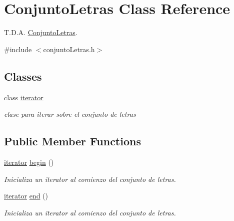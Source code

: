 \hypertarget{classConjuntoLetras}{}\section{Conjunto\+Letras Class Reference}
\label{classConjuntoLetras}


T.\+D.\+A. \mbox{\hyperlink{classConjuntoLetras}{Conjunto\+Letras}}.  




{\ttfamily \#include $<$conjunto\+Letras.\+h$>$}

\subsection*{Classes}
\begin{DoxyCompactItemize}
\item 
class \mbox{\hyperlink{classConjuntoLetras_1_1iterator}{iterator}}
\begin{DoxyCompactList}\small\item\em clase para iterar sobre el conjunto de letras \end{DoxyCompactList}\end{DoxyCompactItemize}
\subsection*{Public Member Functions}
\begin{DoxyCompactItemize}
\item 
\mbox{\label{classConjuntoLetras_afb70b04e316e92b3ab256962686c770e}} 
\mbox{\hyperlink{classConjuntoLetras_1_1iterator}{iterator}} \mbox{\hyperlink{classConjuntoLetras_afb70b04e316e92b3ab256962686c770e}{begin}} ()
\begin{DoxyCompactList}\small\item\em Inicializa un iterator al comienzo del conjunto de letras. \end{DoxyCompactList}\item 
\mbox{\label{classConjuntoLetras_a6523e6639d58d5aad12d7f8b876da10d}} 
\mbox{\hyperlink{classConjuntoLetras_1_1iterator}{iterator}} \mbox{\hyperlink{classConjuntoLetras_a6523e6639d58d5aad12d7f8b876da10d}{end}} ()
\begin{DoxyCompactList}\small\item\em Inicializa un iterator al comienzo del conjunto de letras. \end{DoxyCompactList}\end{DoxyCompactItemize}

